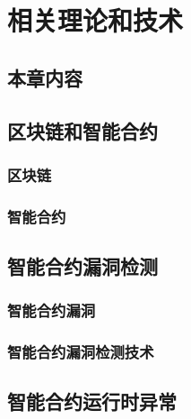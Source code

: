\chapter{相关理论和技术}
\section{本章内容}

\section{区块链和智能合约}
\subsection{区块链}

\subsection{智能合约}


\section{智能合约漏洞检测}
\subsection{智能合约漏洞}
\subsection{智能合约漏洞检测技术}

\section{智能合约运行时异常}